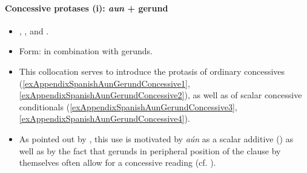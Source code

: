 \paragraph{Concessive protases (i): \textit{aun} + gerund}
\label{appendixSpanishAunGerundConcessive}
\begin{itemize}
	\sloppy
	\item \textcite{FernandezLagunilla1999}, \textcite{PerezSaldanyaVincent2014}, \textcite[§27.5i]{RAEGramatica} and \textcite{Trujillo1990}.
	\item Form: in combination with gerunds.
	\item This collocation serves to introduce the protasis of ordinary concessives (\ref{exAppendixSpanishAunGerundConcessive1}, \ref{exAppendixSpanishAunGerundConcessive2}), as well as of scalar concessive conditionals (\ref{exAppendixSpanishAunGerundConcessive3}, \ref{exAppendixSpanishAunGerundConcessive4}).
	\item As pointed out by \textcite[§27.5i]{RAEGramatica}, this use is motivated by \textit{aún} as a scalar additive () as well as by the fact that gerunds in peripheral position of the clause by themselves often allow for a concessive reading (cf. \cite[§27.5g]{RAEGramatica}).
\end{itemize}
